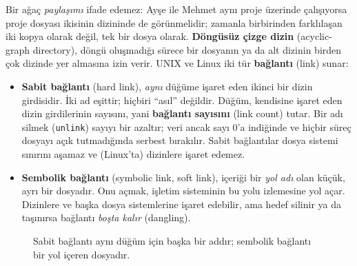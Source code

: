 \documentclass[11pt,a4paper]{article}
\newcommand{\term}[1]{\textbf{\color{mintdeep}#1}}
\newcommand{\cmd}[1]{\texttt{#1}}
\begin{document}
Bir ağaç \emph{paylaşımı} ifade edemez: Ayşe ile Mehmet aynı proje üzerinde çalışıyorsa proje dosyası ikisinin dizininde de görünmelidir; zamanla birbirinden farklılaşan iki kopya olarak değil, tek bir dosya olarak. \term{Döngüsüz çizge dizin} (acyclic-graph directory), döngü oluşmadığı sürece bir dosyanın ya da alt dizinin birden çok dizinde yer almasına izin verir. UNIX ve Linux iki tür \term{bağlantı} (link) sunar:

\begin{itemize}
  \item \term{Sabit bağlantı} (hard link), \emph{aynı} düğüme işaret eden ikinci bir dizin girdisidir. İki ad eşittir; hiçbiri ``asıl'' değildir. Düğüm, kendisine işaret eden dizin girdilerinin sayısını, yani \term{bağlantı sayısını} (link count) tutar. Bir adı silmek (\cmd{unlink}) sayıyı bir azaltır; veri ancak sayı $0$'a indiğinde ve hiçbir süreç dosyayı açık tutmadığında serbest bırakılır. Sabit bağlantılar dosya sistemi sınırını aşamaz ve (Linux'ta) dizinlere işaret edemez.
  \item \term{Sembolik bağlantı} (symbolic link, soft link), içeriği bir \emph{yol adı} olan küçük, ayrı bir dosyadır. Onu açmak, işletim sisteminin bu yolu izlemesine yol açar. Dizinlere ve başka dosya sistemlerine işaret edebilir, ama hedef silinir ya da taşınırsa bağlantı \emph{boşta kalır} (dangling).
\end{itemize}

\begin{figure}[H]
\centering
{}
\caption{Sabit bağlantı aynı düğüm için başka bir addır; sembolik bağlantı bir yol içeren dosyadır.}
\end{figure}
\end{document}
